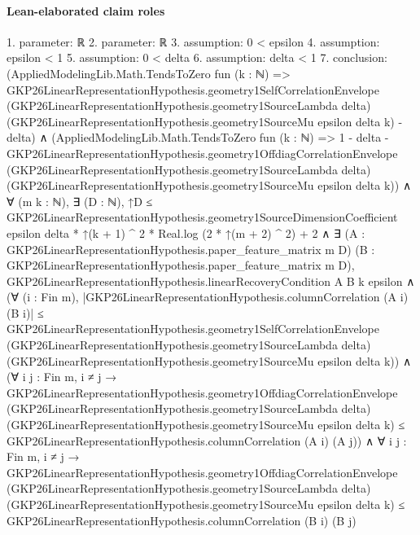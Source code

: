 \documentclass[10pt]{article}
\begin{document}
\paragraph{Lean-elaborated claim roles}\begin{ReviewVerbatim}
1. parameter: ℝ
2. parameter: ℝ
3. assumption: 0 < epsilon
4. assumption: epsilon < 1
5. assumption: 0 < delta
6. assumption: delta < 1
7. conclusion: (AppliedModelingLib.Math.TendsToZero fun (k : ℕ) =>
    GKP26LinearRepresentationHypothesis.geometry1SelfCorrelationEnvelope
        (GKP26LinearRepresentationHypothesis.geometry1SourceLambda delta)
        (GKP26LinearRepresentationHypothesis.geometry1SourceMu epsilon delta k) -
      delta) ∧
  (AppliedModelingLib.Math.TendsToZero fun (k : ℕ) =>
      1 - delta -
        GKP26LinearRepresentationHypothesis.geometry1OffdiagCorrelationEnvelope
          (GKP26LinearRepresentationHypothesis.geometry1SourceLambda delta)
          (GKP26LinearRepresentationHypothesis.geometry1SourceMu epsilon delta k)) ∧
    ∀ (m k : ℕ),
      ∃ (D : ℕ),
        ↑D ≤
            GKP26LinearRepresentationHypothesis.geometry1SourceDimensionCoefficient epsilon delta * ↑(k + 1) ^ 2 *
                Real.log (2 * ↑(m + 2) ^ 2) +
              2 ∧
          ∃ (A : GKP26LinearRepresentationHypothesis.paper_feature_matrix m D) (B :
            GKP26LinearRepresentationHypothesis.paper_feature_matrix m D),
            GKP26LinearRepresentationHypothesis.linearRecoveryCondition A B k epsilon ∧
              (∀ (i : Fin m),
                  |GKP26LinearRepresentationHypothesis.columnCorrelation (A i) (B i)| ≤
                    GKP26LinearRepresentationHypothesis.geometry1SelfCorrelationEnvelope
                      (GKP26LinearRepresentationHypothesis.geometry1SourceLambda delta)
                      (GKP26LinearRepresentationHypothesis.geometry1SourceMu epsilon delta k)) ∧
                (∀ {{i j : Fin m}},
                    i ≠ j →
                      GKP26LinearRepresentationHypothesis.geometry1OffdiagCorrelationEnvelope
                          (GKP26LinearRepresentationHypothesis.geometry1SourceLambda delta)
                          (GKP26LinearRepresentationHypothesis.geometry1SourceMu epsilon delta k) ≤
                        GKP26LinearRepresentationHypothesis.columnCorrelation (A i) (A j)) ∧
                  ∀ {{i j : Fin m}},
                    i ≠ j →
                      GKP26LinearRepresentationHypothesis.geometry1OffdiagCorrelationEnvelope
                          (GKP26LinearRepresentationHypothesis.geometry1SourceLambda delta)
                          (GKP26LinearRepresentationHypothesis.geometry1SourceMu epsilon delta k) ≤
                        GKP26LinearRepresentationHypothesis.columnCorrelation (B i) (B j)
\end{ReviewVerbatim}
\end{document}
